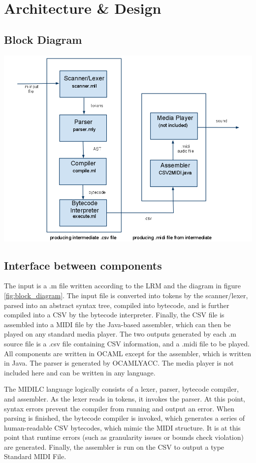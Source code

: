 \documentclass[12pt,A4]{book}
\begin{document}
\chapter{Architecture \& Design}
\section{Block Diagram}

\includegraphics[width=\textwidth]{blockdiagram.png}

\section{Interface between components}
The input is a .m file written according to the LRM and the diagram in figure \ref{fig:block_diagram}. The input file is converted into tokens by the scanner/lexer, parsed into an abstract syntax tree, compiled into bytecode, and is further compiled into a CSV by the bytecode interpreter. Finally, the CSV file is assembled into a MIDI file by the Java-based assembler, which can then be played on any standard media player.  The two outputs generated by each .m source file is a .csv file containing CSV information, and a .midi file to be played.  All components are written in OCAML except for the assembler, which is written in Java.  The parser is generated by OCAMLYACC.  The media player is not included here and can be written in any language.

The MIDILC language logically consists of a lexer, parser, bytecode compiler, and assembler.  As the lexer reads in tokens, it invokes the parser.  At this point, syntax errors prevent the compiler from running and output an error.  When parsing is finished, the bytecode compiler is invoked, which generates a series of human-readable CSV bytecodes, which mimic the MIDI structure.  It is at this point that runtime errors (such as granularity issues or bounds check violation) are generated.  Finally, the assembler is run on the CSV to output a type Standard MIDI File.
\end{document}
